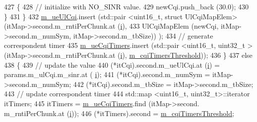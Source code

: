 \begin{DoxyCode}
427                                                 \{
428                                                         \textcolor{comment}{// initialize with NO\_SINR value.}
429                                                         newCqi.push\_back (30.0);
430                                                 \}
431                                         \}
432                                         \hyperlink{classns3_1_1MmWaveFlexTtiMacScheduler_a1b7ed5c8fa4442252efa7cc43318f463}{m\_ueUlCqi}.insert (std::pair <uint16\_t, struct
       UlCqiMapElem> (itMap->second.m\_rntiPerChunk.at (\hyperlink{bernuolliDistribution_8m_a6f6ccfcf58b31cb6412107d9d5281426}{i}),
433                                                                                                      
      UlCqiMapElem (newCqi, itMap->second.m\_numSym, itMap->second.m\_tbSize)) );
434                                         \textcolor{comment}{// generate correspondent timer}
435                                         \hyperlink{classns3_1_1MmWaveFlexTtiMacScheduler_a21afc99c752ed7b331690dc9a479c3f0}{m\_ueCqiTimers}.insert (std::pair <uint16\_t, uint32\_t > 
      (itMap->second.m\_rntiPerChunk.at (\hyperlink{bernuolliDistribution_8m_a6f6ccfcf58b31cb6412107d9d5281426}{i}), \hyperlink{classns3_1_1MmWaveFlexTtiMacScheduler_ab79b59a03053301ed05f22fdb701a7ef}{m\_cqiTimersThreshold}));
436                                 \}
437                                 \textcolor{keywordflow}{else}
438                                 \{
439                                         \textcolor{comment}{// update the value}
440                                         (*itCqi).second.m\_ueUlCqi.at (\hyperlink{bernuolliDistribution_8m_a6f6ccfcf58b31cb6412107d9d5281426}{i}) = params.m\_ulCqi.m\_sinr.at (
      \hyperlink{bernuolliDistribution_8m_a6f6ccfcf58b31cb6412107d9d5281426}{i});
441                                         (*itCqi).second.m\_numSym = itMap->second.m\_numSym;
442                                         (*itCqi).second.m\_tbSize = itMap->second.m\_tbSize;
443                                         \textcolor{comment}{// update correspondent timer}
444                                         std::map <uint16\_t, uint32\_t>::iterator itTimers;
445                                         itTimers = \hyperlink{classns3_1_1MmWaveFlexTtiMacScheduler_a21afc99c752ed7b331690dc9a479c3f0}{m\_ueCqiTimers}.find (itMap->second.
      m\_rntiPerChunk.at (\hyperlink{bernuolliDistribution_8m_a6f6ccfcf58b31cb6412107d9d5281426}{i}));
446                                         (*itTimers).second = 
      \hyperlink{classns3_1_1MmWaveFlexTtiMacScheduler_ab79b59a03053301ed05f22fdb701a7ef}{m\_cqiTimersThreshold};

\end{DoxyCode}
